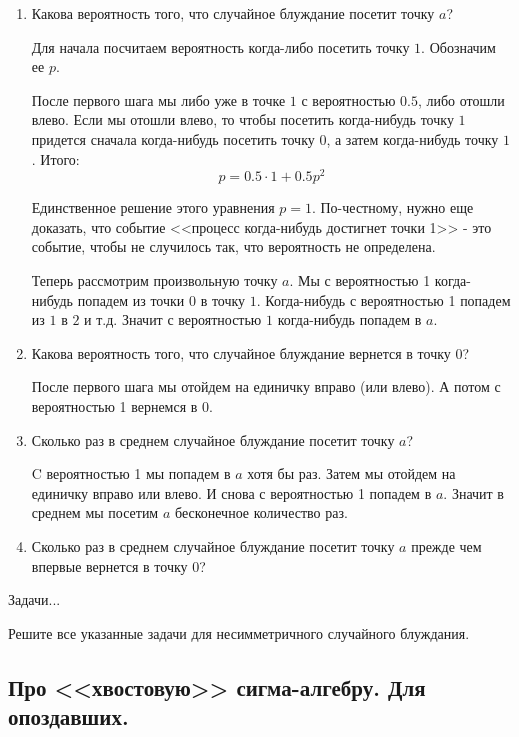 {\begin{enumerate}
\item Какова вероятность того, что случайное блуждание посетит точку $a$?

Для начала посчитаем вероятность когда-либо посетить точку $1$. Обозначим ее $p$.

После первого шага мы либо уже в точке $1$ с вероятностью $0.5$, либо отошли влево. Если мы отошли влево, то чтобы посетить когда-нибудь точку $1$ придется сначала когда-нибудь посетить точку $0$, а затем когда-нибудь точку $1$. Итого:
\begin{equation}
p=0.5\cdot 1 + 0.5 p^{2}
\end{equation}

Единственное решение этого уравнения $p=1$. По-честному, нужно еще доказать, что событие <<процесс когда-нибудь достигнет точки 1>> - это событие, чтобы не случилось так, что вероятность не определена.

Теперь рассмотрим произвольную точку $a$. Мы с вероятностью 1 когда-нибудь попадем из точки $0$ в точку $1$. Когда-нибудь с вероятностью 1 попадем из $1$ в $2$ и т.д. Значит с вероятностью $1$ когда-нибудь попадем в $a$.

\item Какова вероятность того, что случайное блуждание вернется в точку $0$?

После первого шага мы отойдем на единичку вправо (или влево). А потом с вероятностью 1 вернемся в $0$. 

\item Сколько раз в среднем случайное блуждание посетит точку $a$?

C вероятностью 1 мы попадем в $ a $ хотя бы раз. Затем мы отойдем на единичку вправо или влево. И снова с вероятностью 1 попадем в $a$. Значит в среднем мы посетим $a$ бесконечное количество раз. 

\item Сколько раз в среднем случайное блуждание посетит точку $a$ прежде чем впервые вернется в точку $0$?
\end{enumerate}






Задачи...

Решите все указанные задачи для несимметричного случайного блуждания.










}\subsection{Про <<хвостовую>> сигма-алгебру. Для опоздавших.} \problemtext{

}
